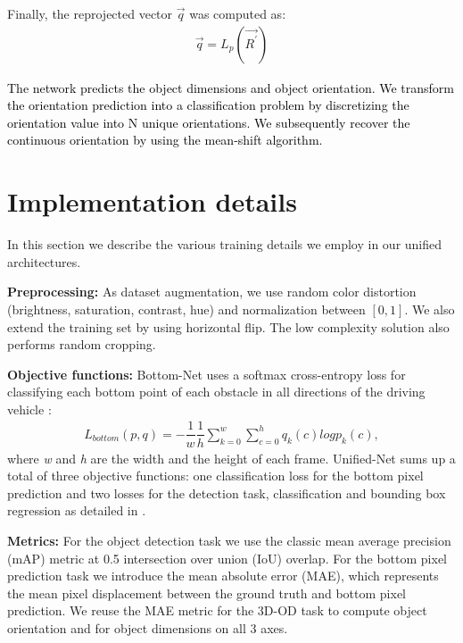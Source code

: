 \documentclass[10pt,twocolumn,letterpaper]{article}
\begin{document}
Finally, the reprojected vector $ \vec{q} $ was computed as:
\begin{equation}
\begin{aligned}
\vec{q} = L_{p}(\vec{R^{'}})
 \end{aligned}
\end{equation}

\textcolor{black}{
The network predicts the object dimensions and object orientation. We transform the orientation prediction into a classification problem by discretizing the orientation value into N unique orientations. We subsequently recover the continuous orientation by using the mean-shift algorithm.}

\section{Implementation details}

In this section we describe the various training details we employ in our unified architectures.


\textbf{Preprocessing: } As dataset augmentation, we use random color distortion (brightness, saturation, contrast, hue) and normalization between $[0, 1]$. We also extend the training set by using horizontal flip. The low complexity solution also performs random cropping.

\textbf{Objective functions: } Bottom-Net uses a softmax cross-entropy loss for classifying each bottom point of each obstacle in all directions of the driving vehicle : 
\begin{equation}
\begin{aligned}
L_{bottom}(p, q) = -\dfrac{1}{w} \dfrac{1}{h}\sum_{k=0}^{w} \sum_{c=0}^{h} q_k(c)log p_k(c),
\end{aligned}
\end{equation}
where \textit{w} and \textit{h} are the width and the height of each frame.
Unified-Net sums up a total of three objective functions: one classification loss for the bottom pixel prediction and two losses for the detection task, classification and bounding box regression as detailed in \cite{faster}.

\textbf{Metrics: }
For the object detection task we use the classic mean average precision (mAP) metric at 0.5 intersection over union (IoU) overlap. For the bottom pixel prediction task we introduce the mean absolute error (MAE), which represents the mean pixel displacement between the ground truth and bottom pixel prediction.
We reuse the MAE metric for the 3D-OD task to compute object orientation and for object dimensions on all 3 axes.
\end{document}
